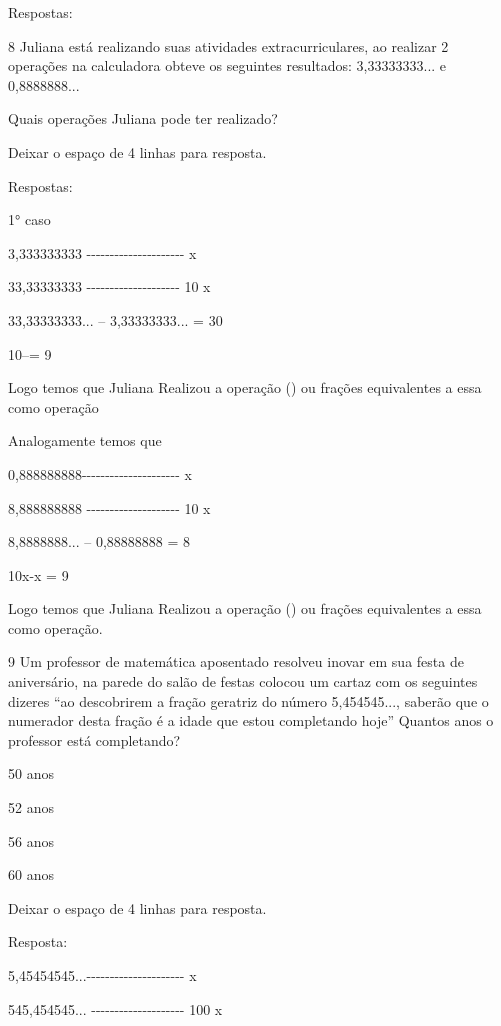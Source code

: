 Respostas:

\num{8} Juliana está realizando suas atividades extracurriculares, ao
realizar 2 operações na calculadora obteve os seguintes resultados:
3,33333333... e 0,8888888...

Quais operações Juliana pode ter realizado?

Deixar o espaço de 4 linhas para resposta.

Respostas:

1° caso

3,333333333
-\/-\/-\/-\/-\/-\/-\/-\/-\/-\/-\/-\/-\/-\/-\/-\/-\/-\/-\/-\/- x

33,33333333 -\/-\/-\/-\/-\/-\/-\/-\/-\/-\/-\/-\/-\/-\/-\/-\/-\/-\/-\/-
10 x

33,33333333... -- 3,33333333... = 30

10\times --\times = 9

Logo temos que Juliana Realizou a operação () ou frações
equivalentes a essa como operação

Analogamente temos que

0,888888888-\/-\/-\/-\/-\/-\/-\/-\/-\/-\/-\/-\/-\/-\/-\/-\/-\/-\/-\/-\/-
x

8,888888888 -\/-\/-\/-\/-\/-\/-\/-\/-\/-\/-\/-\/-\/-\/-\/-\/-\/-\/-\/-
10 x

8,8888888... -- 0,88888888 = 8

10x-x = 9

Logo temos que Juliana Realizou a operação () ou frações
equivalentes a essa como operação.

\num{9} Um professor de matemática aposentado resolveu inovar em sua festa de
aniversário, na parede do salão de festas colocou um cartaz com os
seguintes dizeres ``ao descobrirem a fração geratriz do número
5,454545..., saberão que o numerador desta fração é a idade que estou
completando hoje'' Quantos anos o professor está completando?

\item 50 anos
\item 52 anos
\item 56 anos
\item 60 anos

Deixar o espaço de 4 linhas para resposta.

Resposta:

5,45454545...-\/-\/-\/-\/-\/-\/-\/-\/-\/-\/-\/-\/-\/-\/-\/-\/-\/-\/-\/-\/-
x

545,454545... -\/-\/-\/-\/-\/-\/-\/-\/-\/-\/-\/-\/-\/-\/-\/-\/-\/-\/-\/-
100 x

